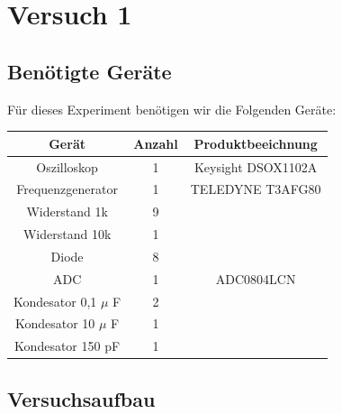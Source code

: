 \chapter{Versuch 1}

\section{Benötigte Geräte}

Für dieses Experiment benötigen wir die Folgenden Geräte:

\begin{tabular}[h]{c|c|c}
    Gerät & Anzahl & Produktbeeichnung\\
    \hline
    Oszilloskop & 1  & Keysight DSOX1102A\\
    \hline
    Frequenzgenerator & 1 & TELEDYNE T3AFG80\\
	\hline 
	Widerstand 1k & 9 &  \\
	\hline 
	Widerstand 10k & 1 &  \\
	\hline
	Diode & 8 & \\
	\hline
	ADC & 1 & ADC0804LCN \\
	\hline
	Kondesator 0,1 $\mu$ F & 2 & \\
	\hline
	Kondesator 10 $\mu$ F & 1 & \\
	\hline
	Kondesator 150 pF & 1 & 
        \label{tab:Materialliste Versuch 1}
\end{tabular}

\section{Versuchsaufbau}

